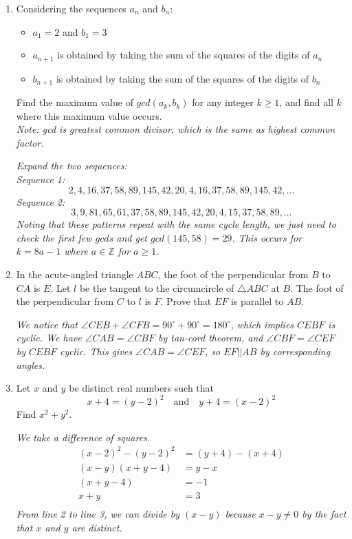 \documentclass{article}
\begin{document}
\begin{enumerate}[1.]
\item %
Considering the sequences $a_n$ and $b_n$:
\begin{itemize}
\item $a_1=2$ and $b_1=3$
\item $a_{n+1}$ is obtained by taking the sum of the squares of the digits of $a_{n}$
\item $b_{n+1}$ is obtained by taking the sum of the squares of the digits of $b_n$
\end{itemize}
Find the maximum value of $gcd(a_k,b_k)$ for any integer $k\geq 1$, and find all $k$ where this maximum value occurs.\\
\textit{Note: gcd is greatest common divisor, which is the same as highest common factor.}

{\itshape Expand the two sequences:\\
Sequence 1: $$2,4,16,37,58,89,145,42,20,4,16,37,58,89,145,42,...$$ Sequence 2: $$3,9,81,65,61,37,58,89,145,42,20,4,15,37,58,89,...$$ Noting that these patterns repeat with the same cycle length, we just need to check the first few $gcd$s and get $gcd(145,58)=29$. This occurs for $k=8a-1$ where $a\in \mathbb{Z}$ for $a\geq 1$.}


\item %
In the acute-angled triangle $ABC$, the foot of the perpendicular from $B$ to $CA$ is $E$. Let $l$ be the tangent to the circumcircle of $\triangle ABC$ at $B$. The foot of the perpendicular from $C$ to $l$ is $F$. Prove that $EF$ is parallel to $AB$.

{\itshape We notice that $\angle CEB + \angle CFB = 90^\circ + 90^\circ = 180^\circ$, which implies $CEBF$ is cyclic. We have $\angle CAB = \angle CBF$ by tan-cord theorem, and $\angle CBF = \angle CEF$ by $CEBF$ cyclic. This gives $\angle CAB = \angle CEF$, so $EF||AB$ by corresponding angles.}


\item %
Let $x$ and $y$ be distinct real numbers such that $$x + 4 = (y - 2)^2 \quad\text{and}\quad y + 4 = (x - 2)^2$$
Find $x^2 + y^2$.

{\itshape We take a difference of squares.
\begin{align*}
(x - 2)^2 - (y - 2)^2 &= (y + 4) - (x + 4)\\
(x - y)(x + y - 4) &= y - x\\
(x + y - 4) &= -1\\
x + y &= 3\\
\end{align*}
From line 2 to line 3, we can divide by $(x - y)$ because $x - y \neq 0$ by the fact that $x$ and $y$ are distinct.

}
\end{enumerate}
\end{document}
